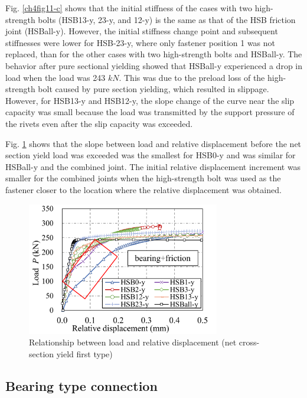Fig. \ref{ch4fig11-c} shows that the initial stiffness of the cases with two high-strength bolts (HSB13-y, 23-y, and 12-y) is the same as that of the HSB friction joint (HSBall-y). However, the initial stiffness change point and subsequent stiffnesses were lower for HSB-23-y, where only fastener position 1 was not replaced, than for the other cases with two high-strength bolts and HSBall-y. The behavior after pure sectional yielding showed that HSBall-y experienced a drop in load when the load was 243 $kN$. This was due to the preload loss of the high-strength bolt caused by pure section yielding, which resulted in slippage. However, for HSB13-y and HSB12-y, the slope change of the curve near the slip capacity was small because the load was transmitted by the support pressure of the rivets even after the slip capacity was exceeded.

Fig. \ref{ch4fig13} shows that the slope between load and relative displacement before the net section yield load was exceeded was the smallest for HSB0-y and was similar for HSBall-y and the combined joint. The initial relative displacement increment was smaller for the combined joints when the high-strength bolt was used as the fastener closer to the location where the relative displacement was obtained.

\begin{figure}
    \centering
    \includegraphics[width=0.75\textwidth]{imgs/ch4/fig13.pdf}
    \caption{Relationship between load and relative displacement (net cross-section yield first type)}
    \label{ch4fig13}
\end{figure}

\subsection{Bearing type connection} %

